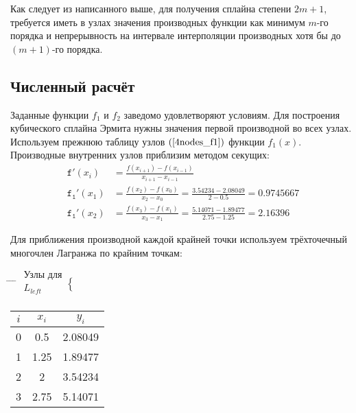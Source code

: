 Как следует из написанного выше, для получения сплайна степени $2m+1$, требуется иметь в узлах значения производных функции как минимум $m$-го порядка и непрерывность на интервале интерполяции производных хотя бы до $(m+1)$-го порядка.

\subsection{Численный расчёт}

Заданные функции $f_1$ и $f_2$ заведомо удовлетворяют условиям. Для построения кубического сплайна Эрмита нужны значения первой производной во всех узлах. Используем прежнюю таблицу узлов $(\ref{4nodes_f1})$ функции $f_1(x)$. Производные внутренних узлов приблизим методом секущих:
\begin{align}
    \mathtt{f'}(x_i) &= \frac{f(x_{i+1})-f(x_{i-1})}{x_{i+1}-x_{i-1}} \\
    \mathtt{f_1'}(x_1) &= \frac{f(x_2)-f(x_0)}{x_2-x_0}=\frac{3.54234-2.08049}{2-0.5}=0.9745667 \\
    \mathtt{f_1'}(x_2) &= \frac{f(x_3)-f(x_1)}{x_3-x_1}=\frac{5.14071-1.89477}{2.75-1.25}=2.16396
\end{align}

Для приближения производной каждой крайней точки используем трёхточечный многочлен Лагранжа по крайним точкам:
\begin{tabbing}
    \hspace*{5cm}\= \hspace*{1.7cm} \= \hspace*{3cm} \= \kill
    \>
    $\begin{smallmatrix}
        \text{Узлы для}\\
        L_{left}\\
    \end{smallmatrix}
    \begin{cases}
        \\\\
    \end{cases}$
    \>
    \begin{tabular}{|c|c|c|}
        \hline
        $i$ & $x_i$ & $y_i$ \\
        \hline
        0 & 0.5 & 2.08049 \\
        \hline
        1 & 1.25 & 1.89477 \\
        \hline
        2 & 2 & 3.54234 \\
        \hline
        3 & 2.75 & 5.14071 \\
        \hline
    \end{tabular}
    \>
\end{tabbing}

